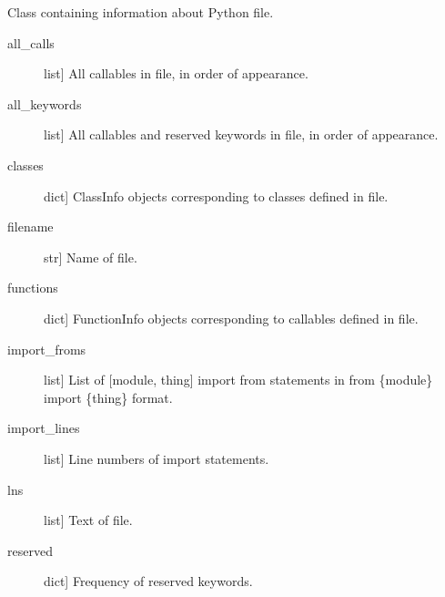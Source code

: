 \documentclass[letterpaper,10pt,english]{sphinxmanual}
\begin{document}

\begin{fulllineitems}
\label{\detokenize{index:unicity.PythonFile}}
Class containing information about Python file.
\begin{description}
\item[{all\_calls}] \leavevmode{[}list{]}
All callables in file, in order of appearance.

\item[{all\_keywords}] \leavevmode{[}list{]}
All callables and reserved keywords in file, in order of appearance.

\item[{classes}] \leavevmode{[}dict{]}
ClassInfo objects corresponding to classes defined in file.

\item[{filename}] \leavevmode{[}str{]}
Name of file.

\item[{functions}] \leavevmode{[}dict{]}
FunctionInfo objects corresponding to callables defined in file.

\item[{import\_froms}] \leavevmode{[}list{]}
List of {[}module, thing{]} import from statements in from \{module\} import \{thing\} format.

\item[{import\_lines}] \leavevmode{[}list{]}
Line numbers of import statements.

\item[{lns}] \leavevmode{[}list{]}
Text of file.

\item[{reserved}] \leavevmode{[}dict{]}
Frequency of reserved keywords.

\end{description}

\end{fulllineitems}

\end{document}

